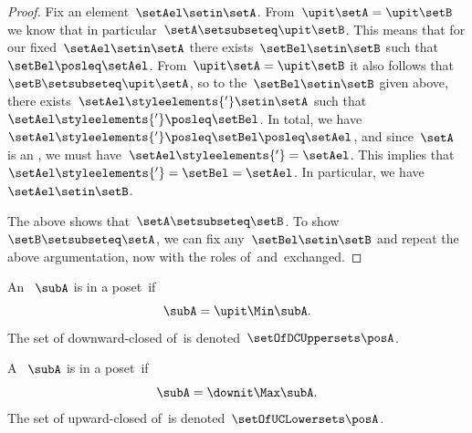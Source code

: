 \begin{proof}
    Fix an element~$\setAel \setin \setA$.
    From~$\upit \setA = \upit \setB$ we know that in particular~$\setA \setsubseteq \upit \setB$.
    This means that for our fixed~$\setAel \setin \setA$ there exists~$\setBel \setin \setB$ such that~$\setBel \posleq \setAel$.
    From~$\upit \setA = \upit \setB$ it also follows that~$\setB \setsubseteq \upit \setA$, so to the~$\setBel \setin \setB$ given above, there exists~$\setAel\styleelements{'} \setin \setA$ such that~$\setAel\styleelements{'} \posleq \setBel$.
    In total, we have~$\setAel\styleelements{'} \posleq \setBel \posleq \setAel$, and since~$\setA$ is an , we must have~$\setAel\styleelements{'} = \setAel$.
    This implies that~$\setAel\styleelements{'} = \setBel = \setAel$.
    In particular, we have~$\setAel \setin \setB$.

    The above shows that~$\setA \setsubseteq \setB$.
    To show~$\setB \setsubseteq \setA$, we can fix any~$\setBel \setin \setB$ and repeat the above argumentation, now with the roles of~\setA and~\setB exchanged.
\end{proof}



\begin{definition}
    \label{def:downward-closed-upperset}
    An ~$\subA$ is  in a poset~\posA if
    \begin{equation}
        \subA = \upit \Min \subA.
    \end{equation}
    The set of downward-closed  of~\posA is denoted~$\setOfDCUppersets \posA$.

\end{definition}

\begin{definition}
    \label{def:upward-closed-lowerset}
    A ~$\subA$ is  in a poset~\posA if
    \begin{equation}
        \subA = \downit \Max \subA.
    \end{equation}
    The set of upward-closed  of~\posA is denoted~$\setOfUCLowersets \posA$.
\end{definition}
